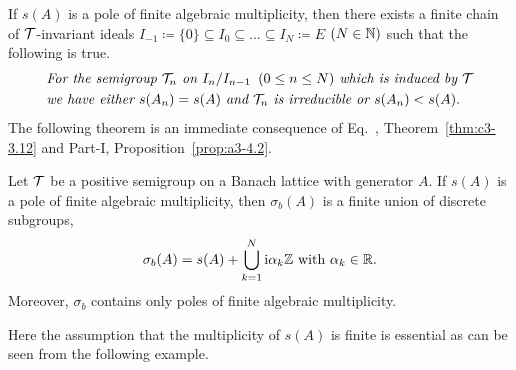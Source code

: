 If\/ $s(A)$ is a pole of finite algebraic multiplicity, then there exists a finite chain of\/ $\mathcal{T}$-invariant ideals $I_{-1} \coloneq  \{0\} \subseteq I_{0}\subseteq \ldots \subseteq I_{N} \coloneq  E$ $(N\in\mathbb{N})$ such that the following is true.
\begin{equation}\label{eq:c3-3.19}
	\begin{split}
	&\textit{For the semigroup $\TT_{n}$ on $I_{n}/I_{n-1}\, \ (0 \leq n \leq N)$ which is induced by $\TT$}
		\\
	& \textit{we have either $s(A_{n}) = s(A)$ and $\TT_{n}$ is irreducible or $s(A_{n}) < s(A)$} .
	\end{split}
\end{equation}
The following theorem is an immediate consequence of Eq.~, Theorem~\ref{thm:c3-3.12} and Part-I, Proposition~\ref{prop:a3-4.2}.
\begin{theorem}\label{thm:c3-3.14}
%
	Let $\mathcal{T}$ be a positive semigroup on a Banach lattice with generator $A$. 
	If\/ $s(A)$ is a pole of finite algebraic multiplicity, then $\sigma_{b}(A)$ is a finite union of discrete subgroups, \ie  
%
\[
		\sigma_{b}(A) = s(A) + \bigcup_{k=1}^{N}\mathrm{i}\alpha_{k}\mathbb{Z} \text{ with $\alpha_{k} \in \mathbb{R}$.}
\]
%
Moreover, $\sigma_{b}$ contains only poles of finite algebraic multiplicity.
\end{theorem}
Here the assumption that the multiplicity of\/ $s(A)$ is finite is essential as can be seen from the following example.
